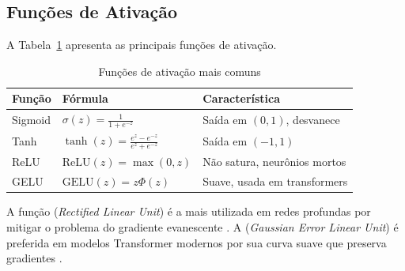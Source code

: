 \subsection{Funções de Ativação}
A Tabela~\ref{tab:ativacoes} apresenta as principais funções de ativação.
\begin{table}[htb]
\centering
\caption{Funções de ativação mais comuns}
\label{tab:ativacoes}
\begin{tabular}{lll}
\toprule
\textbf{Função} & \textbf{Fórmula} & \textbf{Característica} \\
\midrule
Sigmoid & $\sigma(z) = \frac{1}{1+e^{-z}}$ & Saída em $(0,1)$, desvanece \\
Tanh & $\tanh(z) = \frac{e^z - e^{-z}}{e^z + e^{-z}}$ & Saída em $(-1,1)$ \\
ReLU & $\text{ReLU}(z) = \max(0, z)$ & Não satura, neurônios mortos \\
GELU & $\text{GELU}(z) = z\Phi(z)$ & Suave, usada em transformers \\
\bottomrule
\end{tabular}
\end{table}
A função  (\textit{Rectified Linear Unit}) é a mais utilizada
em redes profundas por mitigar o problema do gradiente evanescente
\cite{nair2010relu}. A  (\textit{Gaussian Error Linear Unit})
é preferida em modelos Transformer modernos por sua curva suave que preserva
gradientes \cite{hendrycks2016gaussian}.
